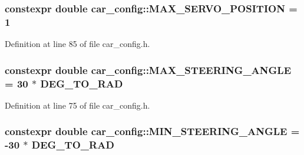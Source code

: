\subsubsection[{\texorpdfstring{M\+A\+X\+\_\+\+S\+E\+R\+V\+O\+\_\+\+P\+O\+S\+I\+T\+I\+ON}{MAX_SERVO_POSITION}}]{\setlength{\rightskip}{0pt plus 5cm}constexpr double car\+\_\+config\+::\+M\+A\+X\+\_\+\+S\+E\+R\+V\+O\+\_\+\+P\+O\+S\+I\+T\+I\+ON = 1}\hypertarget{namespacecar__config_af1712762f3ad9f8805ba474d5f3e7274}{}\label{namespacecar__config_af1712762f3ad9f8805ba474d5f3e7274}


Definition at line 85 of file car\+\_\+config.\+h.

\subsubsection[{\texorpdfstring{M\+A\+X\+\_\+\+S\+T\+E\+E\+R\+I\+N\+G\+\_\+\+A\+N\+G\+LE}{MAX_STEERING_ANGLE}}]{\setlength{\rightskip}{0pt plus 5cm}constexpr double car\+\_\+config\+::\+M\+A\+X\+\_\+\+S\+T\+E\+E\+R\+I\+N\+G\+\_\+\+A\+N\+G\+LE = 30 $\ast$ {\bf D\+E\+G\+\_\+\+T\+O\+\_\+\+R\+AD}}\hypertarget{namespacecar__config_a967b325af26effe80fbbc64dc68a36a0}{}\label{namespacecar__config_a967b325af26effe80fbbc64dc68a36a0}


Definition at line 75 of file car\+\_\+config.\+h.

\subsubsection[{\texorpdfstring{M\+I\+N\+\_\+\+S\+T\+E\+E\+R\+I\+N\+G\+\_\+\+A\+N\+G\+LE}{MIN_STEERING_ANGLE}}]{\setlength{\rightskip}{0pt plus 5cm}constexpr double car\+\_\+config\+::\+M\+I\+N\+\_\+\+S\+T\+E\+E\+R\+I\+N\+G\+\_\+\+A\+N\+G\+LE = -\/30 $\ast$ {\bf D\+E\+G\+\_\+\+T\+O\+\_\+\+R\+AD}}\hypertarget{namespacecar__config_a38229ce5d2e17e0c30b86864fb20d9ce}{}\label{namespacecar__config_a38229ce5d2e17e0c30b86864fb20d9ce}


